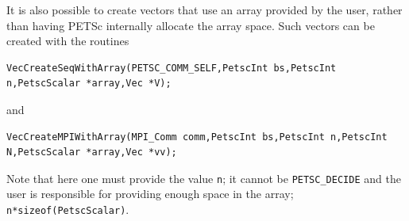 It is also possible to create vectors that use an array provided by the user,
rather than having PETSc internally allocate the array space.
Such vectors can be created with the routines
\begin{lstlisting}
VecCreateSeqWithArray(PETSC_COMM_SELF,PetscInt bs,PetscInt n,PetscScalar *array,Vec *V);
\end{lstlisting}
and
\begin{lstlisting}
VecCreateMPIWithArray(MPI_Comm comm,PetscInt bs,PetscInt n,PetscInt N,PetscScalar *array,Vec *vv);
\end{lstlisting}
Note that here one must provide the value \lstinline{n}; it cannot be \lstinline{PETSC_DECIDE} and
the user is responsible for providing enough space in the array; \lstinline{n*sizeof(PetscScalar)}.

